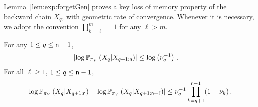\noindent
Lemma~\ref{lem:exp:forgetGen} proves a key loss of memory property of the backward chain $X_q$, with geometric rate of convergence. Whenever it is necessary, we adopt the convention  $\prod_{k=\ell}^{m} = 1$ for any $\ell>m$.
\begin{lemma}
\label{lem:exp:forgetGen}
For any $1\le q\le {\mathsf n}-1$,
\begin{align}
\label{eq:bound:loglikGen}
\left|\log \bP_{\pi_V}\left(X_{q}\middle|X_{q+1:\nobs}\right)\right|&\le \log \left(\nu_q^{-1}\right)\eqsp. 
\end{align}
For all $\ell\ge1$,  $1\le q\le {\mathsf n}-1$,
\begin{equation}\label{eq:bound:forgetGen}
\absj{\log \bP_{\pi_V}\pa{X_{q}\middle|X_{q+1:\nobs}} - \log \bP_{\pi_V}\pa{X_{q}\middle|X_{q+1:\nobs+\ell}}}
\leq \nu^{-1}_q\prod_{k=q+1}^{\nobs-1}(1-\nu_k) \eqsp.
\end{equation}
\end{lemma}
